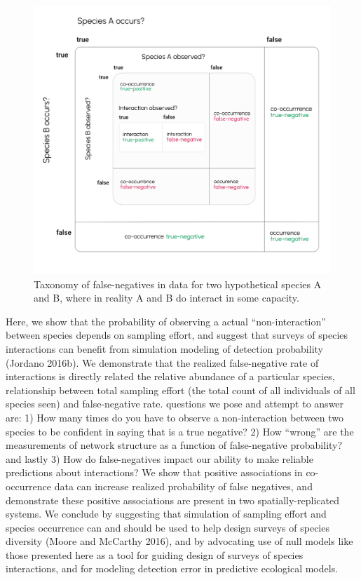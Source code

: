\documentclass[10pt,oneside]{article}
\makeatletter
\def\maxwidth{\ifdim\Gin@nat@width>\linewidth\linewidth
\else\Gin@nat@width\fi}
\let\Oldincludegraphics\includegraphics
\renewcommand{\includegraphics}[1]{\Oldincludegraphics[width=\maxwidth]{#1}}
\makeatother
\begin{document}
\begin{figure}
\hypertarget{fig:taxonomy}{%
\centering
\includegraphics{./figures/concept_v3.png}
\caption{Taxonomy of false-negatives in data for two hypothetical
species A and B, where in reality A and B do interact in some
capacity.}\label{fig:taxonomy}
}
\end{figure}

Here, we show that the probability of observing a actual
``non-interaction'' between species depends on sampling effort, and
suggest that surveys of species interactions can benefit from simulation
modeling of detection probability (Jordano 2016b). We demonstrate that
the realized false-negative rate of interactions is directly related the
relative abundance of a particular species, relationship between total
sampling effort (the total count of all individuals of all species seen)
and false-negative rate. questions we pose and attempt to answer are: 1)
How many times do you have to observe a non-interaction between two
species to be confident in saying that is a true negative? 2) How
``wrong'' are the measurements of network structure as a function of
false-negative probability? and lastly 3) How do false-negatives impact
our ability to make reliable predictions about interactions? We show
that positive associations in co-occurrence data can increase realized
probability of false negatives, and demonstrate these positive
associations are present in two spatially-replicated systems. We
conclude by suggesting that simulation of sampling effort and species
occurrence can and should be used to help design surveys of species
diversity (Moore and McCarthy 2016), and by advocating use of null
models like those presented here as a tool for guiding design of surveys
of species interactions, and for modeling detection error in predictive
ecological models.
\end{document}
